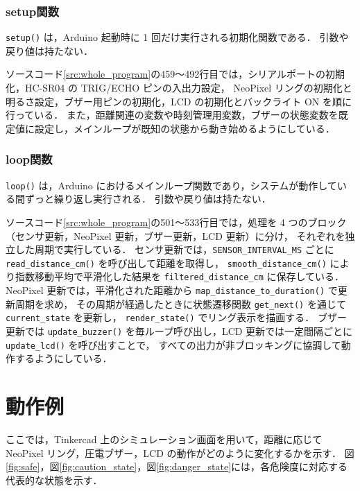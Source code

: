 \documentclass[a4paper,fontsize=11pt,line_length=40zw,number_of_lines=35,baselineskip=1.7zw]{jlreq}
\begin{document}
\subsubsection{setup関数}

\lstinline|setup()| は，Arduino 起動時に 1 回だけ実行される初期化関数である．
引数や戻り値は持たない．

ソースコード\ref{src:whole_program}の459〜492行目では，シリアルポートの初期化，HC-SR04 の TRIG/ECHO ピンの入出力設定，
NeoPixel リングの初期化と明るさ設定，ブザー用ピンの初期化，LCD の初期化とバックライト ON を順に行っている．
また，距離関連の変数や時刻管理用変数，ブザーの状態変数を既定値に設定し，メインループが既知の状態から動き始めるようにしている．

\subsubsection{loop関数}

\lstinline|loop()| は，Arduino におけるメインループ関数であり，システムが動作している間ずっと繰り返し実行される．
引数や戻り値は持たない．

ソースコード\ref{src:whole_program}の501〜533行目では，処理を 4 つのブロック（センサ更新，NeoPixel 更新，ブザー更新，LCD 更新）に分け，
それぞれを独立した周期で実行している．
センサ更新では，\lstinline|SENSOR_INTERVAL_MS| ごとに \lstinline|read_distance_cm()| を呼び出して距離を取得し，
\lstinline|smooth_distance_cm()| により指数移動平均で平滑化した結果を \lstinline|filtered_distance_cm| に保存している．
NeoPixel 更新では，平滑化された距離から \lstinline|map_distance_to_duration()| で更新周期を求め，
その周期が経過したときに状態遷移関数 \lstinline|get_next()| を通じて \lstinline|current_state| を更新し，
\lstinline|render_state()| でリング表示を描画する．
ブザー更新では \lstinline|update_buzzer()| を毎ループ呼び出し，LCD 更新では一定間隔ごとに \lstinline|update_lcd()| を呼び出すことで，
すべての出力が非ブロッキングに協調して動作するようにしている．

\section{動作例}

ここでは，Tinkercad 上のシミュレーション画面を用いて，距離に応じて NeoPixel リング，圧電ブザー，LCD の動作がどのように変化するかを示す．
図\ref{fig:safe}，図\ref{fig:caution_state}，図\ref{fig:danger_state}には，各危険度に対応する代表的な状態を示す．
\end{document}
